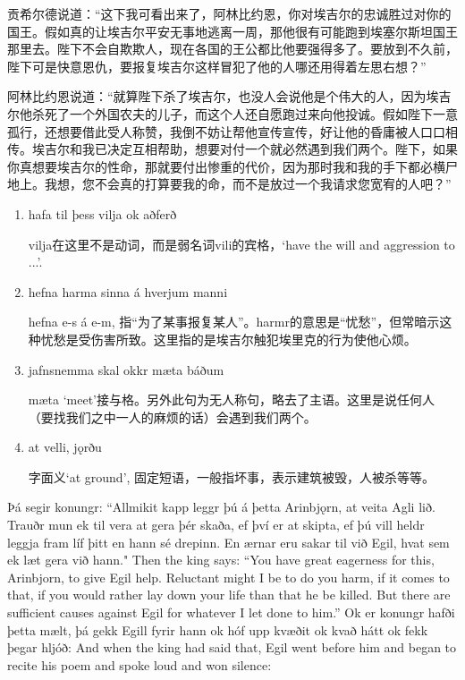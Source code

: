 \begin{translation*}{}
  贡希尔德说道：“这下我可看出来了，阿林比约恩，你对埃吉尔的忠诚胜过对你的国王。假如真的让埃吉尔平安无事地逃离一周，那他很有可能跑到埃塞尔斯坦国王那里去。陛下不会自欺欺人，现在各国的王公都比他要强得多了。要放到不久前，陛下可是快意恩仇，要报复埃吉尔这样冒犯了他的人哪还用得着左思右想？”

  阿林比约恩说道：“就算陛下杀了埃吉尔，也没人会说他是个伟大的人，因为埃吉尔他杀死了一个外国农夫的儿子，而这个人还自愿跑过来向他投诚。假如陛下一意孤行，还想要借此受人称赞，我倒不妨让帮他宣传宣传，好让他的昏庸被人口口相传。埃吉尔和我已决定互相帮助，想要对付一个就必然遇到我们两个。陛下，如果你真想要埃吉尔的性命，那就要付出惨重的代价，因为那时我和我的手下都必横尸地上。我想，您不会真的打算要我的命，而不是放过一个我请求您宽宥的人吧？”
\end{translation*}
\begin{grammar*}{}
  \begin{enumerate}[leftmargin=*]
    \item hafa til þess vilja ok aðferð

          vilja在这里不是动词，而是弱名词vili的宾格，`have the will and aggression to ...'.

    \item hefna harma sinna á hverjum manni

          hefna e-s á e-m, 指“为了某事报复某人”。harmr的意思是“忧愁”，但常暗示这种忧愁是受伤害所致。这里指的是埃吉尔触犯埃里克的行为使他心烦。

    \item jafnsnemma skal okkr mæta báðum

          mæta `meet'接与格。另外此句为无人称句，略去了主语。这里是说任何人（要找我们之中一人的麻烦的话）会遇到我们两个。

    \item at velli, jǫrðu

          字面义`at ground', 固定短语，一般指坏事，表示建筑被毁，人被杀等等。
  \end{enumerate}
\end{grammar*}
\begin{paracol}{2}
  Þá segir konungr: ``Allmikit kapp leggr þú á þetta Arinbjǫrn, at veita Agli lið. Trauðr mun ek til vera at gera þér skaða, ef því er at skipta, ef þú vill heldr leggja fram líf þitt en hann sé drepinn. En ærnar eru sakar til við Egil, hvat sem ek læt gera við hann."
  \switchcolumn
  Then the king says: ``You have great eagerness for this, Arinbjorn, to give Egil help. Reluctant might I be to do you harm, if it comes to that, if you would rather lay down your life than that he be killed. But there are sufficient causes against Egil for whatever I let done to him.''
  \switchcolumn*
  Ok er konungr hafði þetta mælt, þá gekk Egill fyrir hann ok hóf upp kvæðit ok kvað hátt ok fekk þegar hljóð:
  \switchcolumn
  And when the king had said that, Egil went before him and began to recite his poem and spoke loud and won silence:
\end{paracol}

